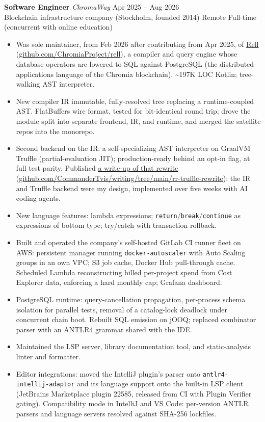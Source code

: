 \documentclass[10pt,a4paper]{article}
\newcommand{\role}[4]{%
  \needspace{4\baselineskip}%
  \noindent\textbf{#1} \textemdash{} \textit{#2} \hfill {\small\color{subtle}#3}\\[-0.25em]
  {\small\color{subtle}#4}\par\vspace{0.1em}
}
\begin{document}
\role{Software Engineer}{ChromaWay}{Apr 2025 -- Aug 2026}{Blockchain infrastructure company (Stockholm, founded 2014) \textbullet{} Remote \textbullet{} Full-time (concurrent with online education)}
\begin{itemize}
  \item Was sole maintainer, from Feb 2026 after contributing from Apr 2025, of \href{https://github.com/ChromiaProject/rell}{Rell} (\url{github.com/ChromiaProject/rell}), a compiler and query engine whose database operators are lowered to SQL against PostgreSQL (the distributed-applications language of the Chromia blockchain). \textasciitilde197K LOC Kotlin; tree-walking AST interpreter.
  \item New compiler IR \textemdash{} immutable, fully-resolved tree replacing a runtime-coupled AST. FlatBuffers wire format, tested for bit-identical round trip; drove the module split into separate frontend, IR, and runtime, and merged the satellite repos into the monorepo.
  \item Second backend on the IR: a self-specializing AST interpreter on GraalVM Truffle (partial-evaluation JIT); production-ready behind an opt-in flag, at full test parity. Published \href{https://github.com/CommanderTvis/writing/tree/main/rr-truffle-rewrite}{a write-up of that rewrite} (\url{github.com/CommanderTvis/writing/tree/main/rr-truffle-rewrite}): the IR and Truffle backend were my design, implemented over five weeks with AI coding agents.
  \item New language features: lambda expressions; \texttt{return}/\texttt{break}/\texttt{continue} as expressions of bottom type; try/catch with transaction rollback.
  \item Built and operated the company's self-hosted GitLab CI runner fleet on AWS: persistent manager running \texttt{docker-autoscaler} with Auto Scaling groups in an own VPC; S3 job cache, Docker Hub pull-through cache. Scheduled Lambda reconstructing billed per-project spend from Cost Explorer data, enforcing a hard monthly cap; Grafana dashboard.
  \item PostgreSQL runtime: query-cancellation propagation, per-process schema isolation for parallel tests, removal of a catalog-lock deadlock under concurrent chain boot. Rebuilt SQL emission on jOOQ; replaced combinator parser with an ANTLR4 grammar shared with the IDE.
  \item Maintained the LSP server, library documentation tool, and static-analysis linter and formatter.
  \item Editor integrations: moved the IntelliJ plugin's parser onto \texttt{antlr4-intellij-adaptor} and its language support onto the built-in LSP client (JetBrains Marketplace plugin 22585, released from CI with Plugin Verifier gating). Compatibility mode in IntelliJ and VS Code: per-version ANTLR parsers and language servers resolved against SHA-256 lockfiles.

\end{itemize}
\end{document}
